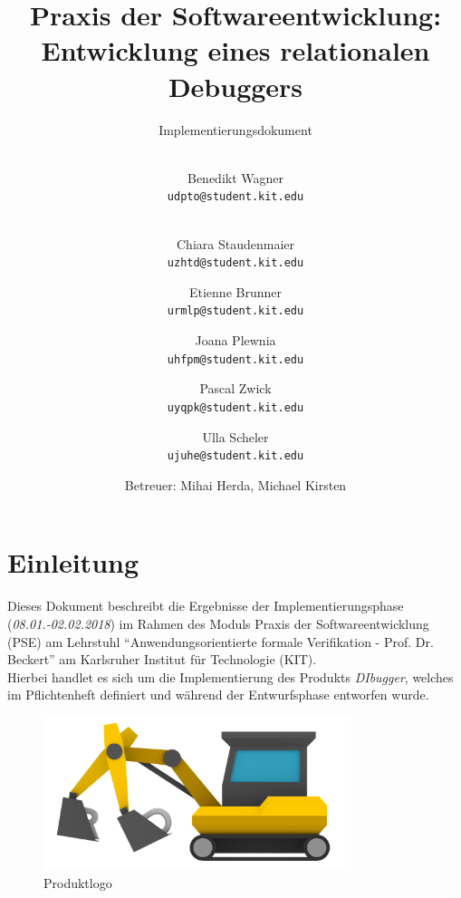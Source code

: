 \documentclass[parskip=full]{scrartcl}
\title{
	\vspace{2cm}
	\myfont 
	Praxis der Softwareentwicklung:\\ 
	Entwicklung eines relationalen Debuggers\\
}
\subtitle{
	\vspace{1cm}
	\myfont
	Implementierungsdokument
}
\author{
	\vspace{1cm} \\
	Benedikt Wagner\\
	\texttt{udpto@student.kit.edu}
	\and \vspace{1cm} \\ Chiara Staudenmaier\\
	\texttt{uzhtd@student.kit.edu}
	\and Etienne Brunner\\
	\texttt{urmlp@student.kit.edu}
	\and Joana Plewnia\\
	\texttt{uhfpm@student.kit.edu} 
	\and Pascal Zwick\\
	\texttt{uyqpk@student.kit.edu}
	\and Ulla Scheler\\
	\texttt{ujuhe@student.kit.edu}
	\vspace{1cm}
	\and Betreuer: Mihai Herda, Michael Kirsten
	\vspace{4cm}
}
\begin{document}
\clearpage
\maketitle
{}
\newpage

\tableofcontents
\newpage
{}

\section{Einleitung}
Dieses Dokument beschreibt die Ergebnisse der Implementierungsphase (\textit{08.01.-02.02.2018}) im Rahmen des Moduls Praxis der Softwareentwicklung (PSE) am Lehrstuhl \enquote{Anwendungsorientierte formale Verifikation - Prof. Dr. Beckert} am Karlsruher Institut für Technologie (KIT).\\
Hierbei handlet es sich um die Implementierung des Produkts \textit{DIbugger}, welches im Pflichtenheft definiert und während der Entwurfsphase entworfen wurde.

\begin{figure}[!h]
\centering
\includegraphics[width=0.8\textwidth]{../Plichtenheft/logo_nongi.png}
\caption{Produktlogo}
\end{figure}
\end{document}
